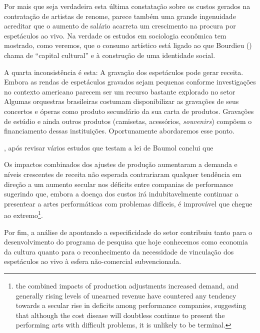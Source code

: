 \documentclass[a4paper, 12pt, openright, oneside, german, french, english, brazil]{abntex2}
\begin{document}
	Por mais que seja verdadeira esta última constatação sobre os custos gerados na contratação de artistas de renome, parece também uma grande ingenuidade acreditar que o aumento de salário acarreta um crescimento na procura por espetáculos ao vivo. Na verdade os estudos em sociologia econômica tem mostrado, como veremos, que o consumo artístico está ligado ao que Bourdieu (\citeyear{bourdieu2011forms,bourdieu2003amor,bourdieu2007distincao}) chama de ``capital cultural'' e à construção de uma identidade social. 
	
	A quarta inconsistência é esta: A gravação dos espetáculos pode gerar receita. Embora as rendas de espetáculos gravados sejam pequenas conforme investigações no contexto americano  parecem ser um recurso bastante explorado no setor Algumas orquestras brasileiras costumam disponibilizar as gravações de seus concertos e óperas como produto secundário da sua carta de produtos. Gravações de estúdio e ainda outros produtos (camisetas, acessórios, \textit{souvenirs}) compõem o financiamento dessas instituições. Oportunamente abordaremos esse ponto.
	
	, após revisar vários estudos que testam a lei de Baumol conclui que
	
	\begin{citacao}
		Os impactos combinados dos ajustes de produção aumentaram a demanda e níveis crescentes de receita não esperada contrariaram qualquer tendência em direção a um aumento secular nos déficits entre companias de performance sugerindo que, embora a doença dos custos irá indubitavelmente continuar a presentear a artes performáticas com problemas difíceis, é improvável que chegue ao extremo\footnote{the combined impacts of production adjustments increased demand, and generally rising levels of unearned revenue have countered any tendency towards a secular rise in deficits among performance companies, suggesting that although the cost disease will doubtless continue to present the performing arts with difficult problems, it is unlikely to be terminal.}. \cite[p. 16]{throsby1994production}
	\end{citacao}
	
	Por fim, a análise de  apontando a especificidade do setor contribuiu tanto para o desenvolvimento do programa de pesquisa que hoje conhecemos como economia da cultura quanto para o reconhecimento da necessidade de vinculação dos espetáculos ao vivo à esfera não-comercial subvencionada. 
	
\end{document}
